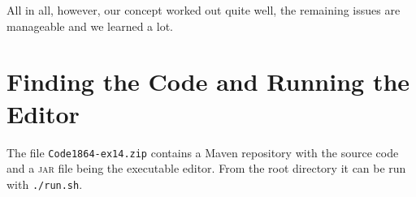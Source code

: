 \documentclass[a4paper,final,12pt,oneside,article,table]{memoir}
\begin{document}
All in all, however, our concept worked out quite well, the remaining
issues are manageable and we learned a lot.

\appendix

\chapter{Finding the Code and Running the Editor}

The file \texttt{Code1864-ex14.zip} contains a Maven repository with the source
code and a \textsc{jar} file being the executable editor. From the
root directory it can be run with \texttt{./run.sh}.


\setlength{\RaggedRightRightskip}{0pt plus 4em} %
\RaggedRight
\printbibliography
\end{document}
